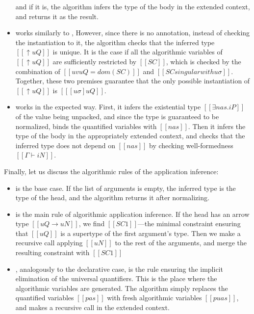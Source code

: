 \documentclass[acmsmall,natbib=false,review,anonymous]{acmart}
\begin{document}
\begin{itemize}
    and if it is, the algorithm infers the type of the body in the extended context,
    and returns it as the result. 
  \item {}
    works similarly to ,
    However, since there is no annotation, 
    instead of checking the instantiation to it, 
    the algorithm checks that the inferred type
    $[[↑uQ]]$ is unique.
    It is the case if all the algorithmic variables of 
    $[[↑uQ]]$ are sufficiently restricted by $[[SC]]$,
    which is checked by the combination of
    $[[uv uQ = dom(SC)]]$ and $[[SC singular with uσ]]$.
    Together, these two premises guarantee that the only 
    possible instantiation of $[[↑uQ]]$ is $[[ [uσ]uQ ]]$.
  \item {}
    works in the expected way. First, it infers the 
    existential type $[[∃nas.iP]]$ of the value being unpacked,
    and since the type is guaranteed to be normalized, binds 
    the quantified variables with $[[nas]]$.
    Then it infers the type of the body in the appropriately extended context,
    and checks that the inferred type does not depend on $[[nas]]$
    by checking well-formedness $[[Γ ⊢ iN]]$.
\end{itemize}

Finally, let us discuss the algorithmic rules of the application inference:
\begin{itemize}
  \item {}
    is the base case. If the list of arguments is empty, 
    the inferred type is the type of the head,
    and the algorithm returns it after normalizing.
  \item {}
    is the main rule of algorithmic application inference.
    If the head has an arrow type $[[uQ → uN]]$,
    we find $[[SC1]]$---the minimal constraint ensuring that 
    $[[uQ]]$ is a supertype of the first argument's type.
    Then we make a recursive call applying $[[uN]]$ to the rest of the arguments,
    and merge the resulting constraint with $[[SC1]]$
  \item {},
    analogously to the declarative case,
    is the rule ensuring the implicit elimination of the universal quantifiers. 
    This is the place where the algorithmic variables are generated.
    The algorithm simply replaces the quantified variables 
    $[[pas]]$ with fresh algorithmic variables $[[puas]]$,
    and makes a recursive call in the extended context. 
\end{itemize}
\end{document}
